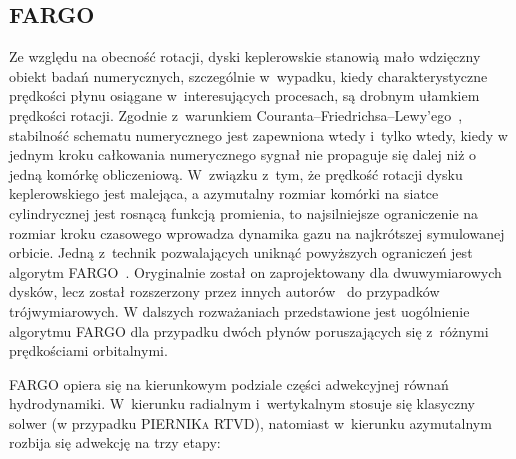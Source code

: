 \subsection{FARGO}
Ze względu na obecność rotacji, dyski keplerowskie stanowią mało wdzięczny
obiekt badań numerycznych, szczególnie w~wypadku, kiedy charakterystyczne
prędkości płynu osiągane w~interesujących procesach, są drobnym ułamkiem
prędkości rotacji. Zgodnie z~warunkiem Cou\-ran\-ta--Friedrichsa--Lewy'ego~\cite{cir},
stabilność schematu numerycznego jest zapewniona wtedy i~tylko wtedy, kiedy w
jednym kroku całkowania numerycznego sygnał nie propaguje się dalej niż o jedną
komórkę obliczeniową. W~związku z~tym, że prędkość rotacji dysku keplerowskiego
jest malejąca, a azymutalny rozmiar komórki na siatce cylindrycznej jest rosnącą
funkcją promienia, to najsilniejsze ograniczenie na rozmiar kroku czasowego
wprowadza dynamika gazu na najkrótszej symulowanej orbicie. Jedną z~technik
pozwalających uniknąć powyższych ograniczeń jest algorytm FARGO~\citep{M00}.
Oryginalnie został on zaprojektowany dla dwuwymiarowych dysków, lecz został
rozszerzony przez innych autorów~\cite{KBK09} do przypadków trójwymiarowych.  W
dalszych rozważaniach przedstawione jest uogólnienie algorytmu FARGO dla
przypadku dwóch płynów poruszających się z~różnymi prędkościami orbitalnymi.
%
\par FARGO opiera się na kierunkowym podziale części adwekcyjnej równań
hydrodynamiki. W~kierunku radialnym i~wertykalnym stosuje się klasyczny solwer
(w przypadku \textsc{PIERNIKa} RTVD), natomiast w~kierunku azymutalnym rozbija się
adwekcję na trzy etapy:
